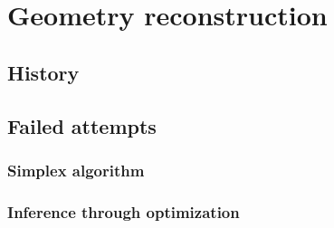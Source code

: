 \chapter{Geometry reconstruction}\label{ch:GeometryReconstruction}

\section{History}
\section{Failed attempts}
\subsection{Simplex algorithm}
\subsection{Inference through optimization}

